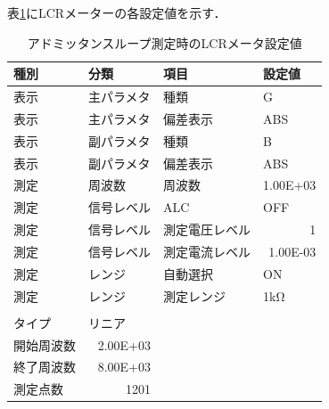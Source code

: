 \documentclass[dvipdfmx,titlepage,a4j]{jsarticle}  %
\numberwithin{equation}{section}
\begin{document}
表\ref{tbl:lcrm-admitance-loop}にLCRメーターの各設定値を示す．
\begin{table}[H]
  \caption{アドミッタンスループ測定時のLCRメータ設定値}
  \begin{center}
    \begin{tabular}{l|l|l|l}
      \hline
      種別           & 分類                          & 項目           & 設定値                       \\ \hline\hline
      表示           & 主パラメタ                    & 種類           & G                            \\ \hline
      表示           & 主パラメタ                    & 偏差表示       & ABS                          \\ \hline
      表示           & 副パラメタ                    & 種類           & B                            \\ \hline
      表示           & 副パラメタ                    & 偏差表示       & ABS                          \\ \hline
      測定           & 周波数                        & 周波数         & \multicolumn{1}{r}{1.00E+03} \\ \hline
      測定           & 信号レベル                    & ALC            & OFF                          \\ \hline
      測定           & 信号レベル                    & 測定電圧レベル & \multicolumn{1}{r}{1}        \\ \hline
      測定           & 信号レベル                    & 測定電流レベル & \multicolumn{1}{r}{1.00E-03} \\ \hline
      測定           & レンジ                        & 自動選択       & ON                           \\ \hline
      測定           & レンジ                        & 測定レンジ     & 1kΩ                          \\ \hline
      [スイープ測定] &                               &                &                              \\ \hline
      タイプ         & リニア                        &                &                              \\ \hline
      開始周波数     & \multicolumn{1}{r|}{2.00E+03} &                &                              \\ \hline
      終了周波数     & \multicolumn{1}{r|}{8.00E+03} &                &                              \\ \hline
      測定点数       & \multicolumn{1}{r|}{1201}     &                &                              \\ \hline
    \end{tabular}
  \end{center}
  \label{tbl:lcrm-admitance-loop}
\end{table}
\end{document}
